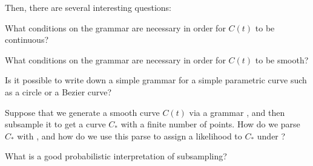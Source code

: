 Then, there are several interesting questions:

\begin{q}
What conditions on the grammar are necessary in order for $C(t)$ to
be continuous?
\end{q}

\begin{q}
What conditions on the grammar are necessary in order for $C(t)$ to
be smooth?
\end{q}

\begin{q}
Is it possible to write down a simple grammar for a simple parametric
curve such as a circle or a Bezier curve?
\end{q}

\begin{q}
Suppose that we generate a smooth curve $C(t)$ via a grammar \GGG, and
then subsample it to get a curve $C_*$ with a finite number of
points. How do we parse $C_*$ with \GGG, and how do we use this parse
to assign a likelihood to $C_*$ under \GGG?
\end{q}

\begin{q}
What is a good probabilistic interpretation of subsampling?
\end{q}



